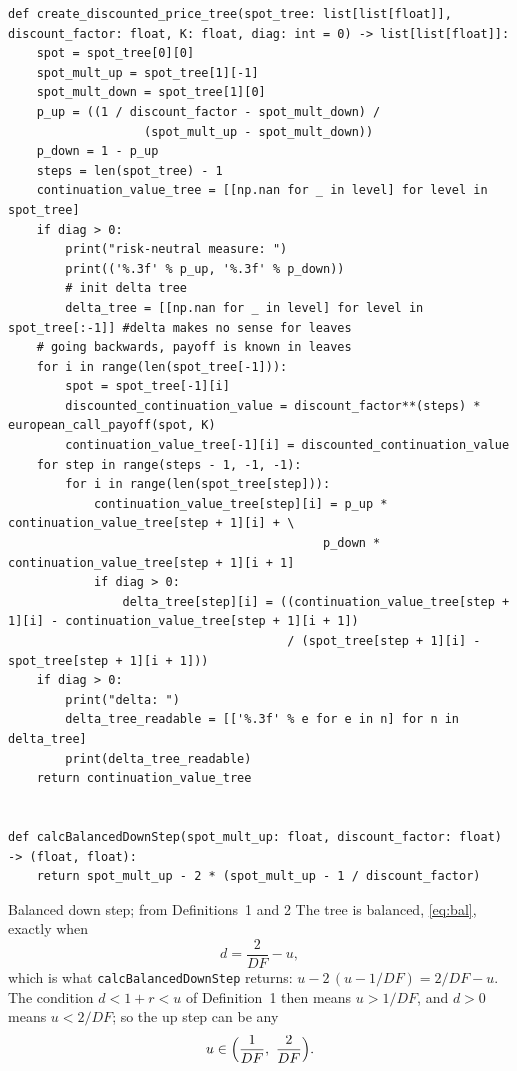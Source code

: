 \documentclass[11pt,a4paper]{article}
\begin{document}
\begin{minipage}{\linewidth}
\begin{lstlisting}[style=prof,title={lecture code (\texttt{prof\_tree.py})}]
def create_discounted_price_tree(spot_tree: list[list[float]], discount_factor: float, K: float, diag: int = 0) -> list[list[float]]:
    spot = spot_tree[0][0]
    spot_mult_up = spot_tree[1][-1]
    spot_mult_down = spot_tree[1][0]
    p_up = ((1 / discount_factor - spot_mult_down) /
                   (spot_mult_up - spot_mult_down))
    p_down = 1 - p_up
    steps = len(spot_tree) - 1
    continuation_value_tree = [[np.nan for _ in level] for level in spot_tree]
    if diag > 0:
        print("risk-neutral measure: ")
        print(('%.3f' % p_up, '%.3f' % p_down))
        # init delta tree
        delta_tree = [[np.nan for _ in level] for level in spot_tree[:-1]] #delta makes no sense for leaves
    # going backwards, payoff is known in leaves
    for i in range(len(spot_tree[-1])):
        spot = spot_tree[-1][i]
        discounted_continuation_value = discount_factor**(steps) * european_call_payoff(spot, K)
        continuation_value_tree[-1][i] = discounted_continuation_value
    for step in range(steps - 1, -1, -1):
        for i in range(len(spot_tree[step])):
            continuation_value_tree[step][i] = p_up * continuation_value_tree[step + 1][i] + \
                                            p_down * continuation_value_tree[step + 1][i + 1]
            if diag > 0:
                delta_tree[step][i] = ((continuation_value_tree[step + 1][i] - continuation_value_tree[step + 1][i + 1]) 
                                       / (spot_tree[step + 1][i] - spot_tree[step + 1][i + 1]))
    if diag > 0:
        print("delta: ")
        delta_tree_readable = [['%.3f' % e for e in n] for n in delta_tree]
        print(delta_tree_readable)
    return continuation_value_tree


def calcBalancedDownStep(spot_mult_up: float, discount_factor: float) -> (float, float):
    return spot_mult_up - 2 * (spot_mult_up - 1 / discount_factor)
\end{lstlisting}\end{minipage}\par\smallskip

\begin{lembox}{Balanced down step; from Definitions~1 and 2}
The tree is balanced, \eqref{eq:bal}, exactly when
\begin{equation}\label{eq:down}
d=\frac{2}{DF}-u ,
\end{equation}
which is what \texttt{calcBalancedDownStep} returns: $u-2\,(u-1/DF)=2/DF-u$. The condition $d<1+r<u$ of Definition~1 then means $u>1/DF$, and $d>0$ means $u<2/DF$; so the up step can be any
\[
u\in\Bigl(\frac1{DF},\ \frac2{DF}\Bigr).
\]
\end{lembox}
\end{document}
